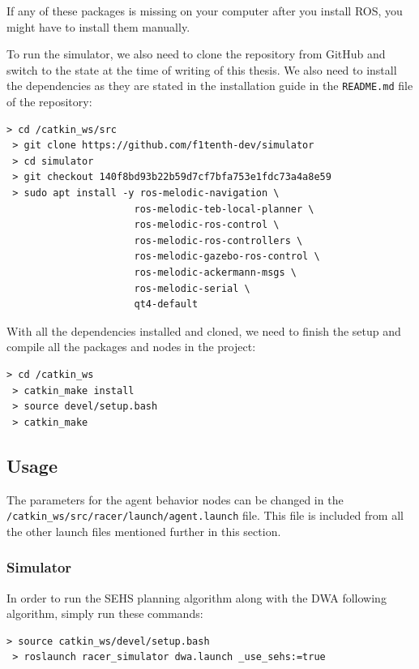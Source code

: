 If any of these packages is missing on your computer after you install ROS, you might have to install them manually.

To run the simulator, we also need to clone the repository from GitHub and switch to the state at the time of writing of this thesis. We also need to install the dependencies as they are stated in the installation guide in the \texttt{README.md} file of the repository:

\begin{Verbatim}[fontsize=\small]
 > cd /catkin_ws/src
 > git clone https://github.com/f1tenth-dev/simulator
 > cd simulator
 > git checkout 140f8bd93b22b59d7cf7bfa753e1fdc73a4a8e59
 > sudo apt install -y ros-melodic-navigation \
                      ros-melodic-teb-local-planner \
                      ros-melodic-ros-control \
                      ros-melodic-ros-controllers \
                      ros-melodic-gazebo-ros-control \
                      ros-melodic-ackermann-msgs \
                      ros-melodic-serial \
                      qt4-default
\end{Verbatim}

With all the dependencies installed and cloned, we need to finish the setup and compile all the packages and nodes in the project:

\begin{Verbatim}[fontsize=\small]
 > cd /catkin_ws
 > catkin_make install
 > source devel/setup.bash
 > catkin_make
\end{Verbatim}

\subsection{Usage}

The parameters for the agent behavior nodes can be changed in the \texttt{/catkin\_ws/\-src/\-racer/launch/\-agent.launch} file. This file is included from all the other launch files mentioned further in this section.

\subsubsection{Simulator}

In order to run the \gls*{SEHS} planning algorithm along with the \gls*{DWA} following algorithm, simply run these commands:

\begin{Verbatim}[fontsize=\small]
 > source catkin_ws/devel/setup.bash
 > roslaunch racer_simulator dwa.launch _use_sehs:=true
\end{Verbatim}


